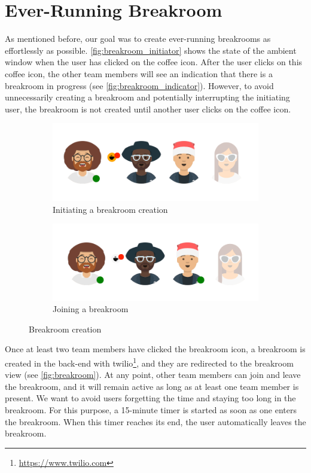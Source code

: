 \section{Ever-Running Breakroom}
As mentioned before, our goal was to create ever-running breakrooms as effortlessly as possible. \autoref{fig:breakroom_initiator} shows the state of the ambient window when the user has clicked on the coffee icon. After the user clicks on this coffee icon, the other team members will see an indication that there is a breakroom in progress (see \autoref{fig:breakroom_indicator}). However, to avoid unnecessarily creating a breakroom and potentially interrupting the initiating user, the breakroom is not created until another user clicks on the coffee icon.

\begin{figure}[h]
    \centering
    \begin{subfigure}{.5\textwidth}
        \centering
        \includegraphics[width=.8\linewidth]{./images/breakroom_initiator.png}
        \caption{Initiating a breakroom creation }
        \label{fig:breakroom_initiator}
    \end{subfigure}%
    \begin{subfigure}{.5\textwidth}
        \centering
        \includegraphics[width=.8\linewidth]{./images/breakroom_indicator.png}
        \caption{Joining a breakroom }
        \label{fig:breakroom_indicator}
    \end{subfigure}
    \caption{Breakroom creation}
\end{figure}

Once at least two team members have clicked the breakroom icon, a breakroom is created in the back-end with twilio\footnote{\url{https://www.twilio.com}}, and they are redirected to the breakroom view (see \autoref{fig:breakroom}). At any point, other team members can join and leave the breakroom, and it will remain active as long as at least one team member is present. We want to avoid users forgetting the time and staying too long in the breakroom. For this purpose, a 15-minute timer is started as soon as one enters the breakroom. When this timer reaches its end, the user automatically leaves the breakroom.

